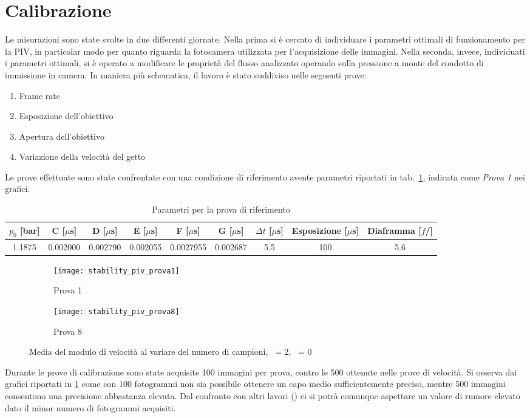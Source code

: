 \documentclass{article} %
\newcommand{\xd}{\nicefrac{\textrm{x}}{\textrm{D}}\ }
\newcommand{\yd}{\nicefrac{\textrm{y}}{\textrm{D}}\ }
\begin{document}
\section{Calibrazione}
Le misurazioni sono state svolte in due differenti giornate. Nella prima si è cercato di individuare i parametri ottimali di funzionamento per la PIV, in particolar modo per quanto riguarda la fotocamera utilizzata per l'acquisizione delle immagini. Nella seconda, invece, individuati i parametri ottimali, si è operato a modificare le proprietà del flusso analizzato operando sulla pressione a monte del condotto di immissione in camera. In maniera più schematica, il lavoro è stato suddiviso nelle seguenti prove:
\begin{enumerate} \itemsep0em
	\item Frame rate
	\item Esposizione dell'obiettivo
	\item Apertura dell'obiettivo
	\item Variazione della velocità del getto
\end{enumerate}\par
Le prove effettuate sono state confrontate con una condizione di riferimento avente parametri riportati in tab.~\ref{tab:parametri_rif}, indicata come \textit{Prova 1} nei grafici.
\begin{table}[h!]
	\centering
	\begin{tabular}{@{}ccccccccc@{}}
		\toprule
		$p_{0}$ [bar] & C [$\mu$s] & D [$\mu$s] & E [$\mu$s] & F [$\mu$s] & G [$\mu$s] & $\Delta t$ [$\mu$s] & Esposizione [$\mu$s] & Diaframma [$f$/] \\ \midrule
		1.1875 & 0.002000 & 0.002790 & 0.002055 & 0.0027955 & 0.002687 & 5.5 & 100 & 5.6 \\ \bottomrule
		\end{tabular}
	\caption{Parametri per la prova di riferimento}
	\label{tab:parametri_rif}
\end{table}\par
\begin{figure}[h!]
	\begin{subfigure}{0.5\textwidth}
		\texttt{[image: stability\_piv\_prova1]}
		\caption{Prova 1}
	\end{subfigure}
	\begin{subfigure}{0.5\textwidth}
		\texttt{[image: stability\_piv\_prova8]}
		\caption{Prova 8}
	\end{subfigure}
	\caption{Media del modulo di velocità al variare del numero di campioni, \xd = 2, \yd = 0}
	\label{fig:stabilita_piv}
\end{figure}
Durante le prove di calibrazione sono state acquisite 100 immagini per prova, contro le 500 ottenute nelle prove di velocità. Si osserva dai grafici riportati in \cref{fig:stabilita_piv} come con 100 fotogrammi non sia possibile ottenere un capo medio sufficientemente preciso, mentre 500 immagini consentono una precisione abbastanza elevata. Dal confronto con altri lavori (\cite{falchi09}) ci si potrà comunque aspettare un valore di rumore elevato dato il minor numero di fotogrammi acquisiti. 
\end{document}
